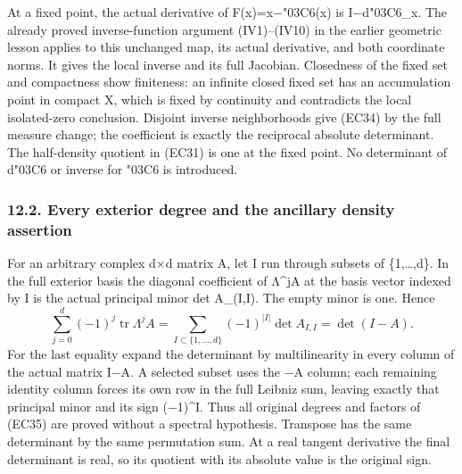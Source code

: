\documentclass[
  11pt,
]{article}
\begin{document}
At a fixed point, the actual derivative of F(x)=x−{\ReaderSymbols\char"03C6}(x) is I−d{\ReaderSymbols\char"03C6}\_x. The
already proved inverse-function argument (IV1)--(IV10) in the earlier
geometric lesson applies to this unchanged map, its actual derivative,
and both coordinate norms. It gives the local inverse and its full
Jacobian. Closedness of the fixed set and compactness show finiteness:
an infinite closed fixed set has an accumulation point in compact X,
which is fixed by continuity and contradicts the local isolated-zero
conclusion. Disjoint inverse neighborhoods give (EC34) by the full
measure change; the coefficient is exactly the reciprocal absolute
determinant. The half-density quotient in (EC31) is one at the fixed
point. No determinant of d{\ReaderSymbols\char"03C6} or inverse for {\ReaderSymbols\char"03C6} is introduced.

\subsubsection{12.2. Every exterior degree and the ancillary density
assertion}\label{every-exterior-degree-and-the-ancillary-density-assertion}

For an arbitrary complex d×d matrix A, let I run through subsets of
\{1,\ldots,d\}. In the full exterior basis the diagonal coefficient of
Λ\^{}jA at the basis vector indexed by I is the actual principal minor
det A\_(I,I). The empty minor is one. Hence \[
\sum_{j=0}^d(-1)^j\operatorname{tr}\Lambda^j A
 =\sum_{I\subset\{1,\ldots,d\}}(-1)^{|I|}\det A_{I,I}
 =\det(I-A).
\tag{LC11}
\] For the last equality expand the determinant by multilinearity in
every column of the actual matrix I−A. A selected subset uses the −A
column; each remaining identity column forces its own row in the full
Leibniz sum, leaving exactly that principal minor and its sign
(−1)\^{}\textbar I\textbar. Thus all original degrees and factors of
(EC35) are proved without a spectral hypothesis. Transpose has the same
determinant by the same permutation sum. At a real tangent derivative
the final determinant is real, so its quotient with its absolute value
is the original sign.
\end{document}
